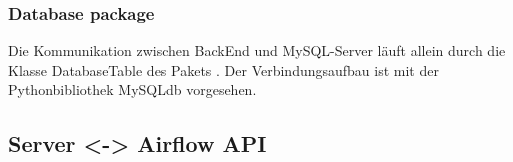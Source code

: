 \subsubsection{Database package}
Die Kommunikation zwischen BackEnd und MySQL-Server läuft allein durch die Klasse DatabaseTable des Pakets . 
Der Verbindungsaufbau ist mit der Pythonbibliothek MySQLdb vorgesehen.


\subsection{Server <-> Airflow API}

\newpage